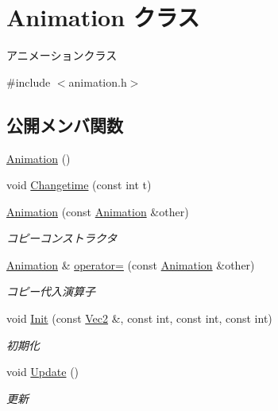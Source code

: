 \hypertarget{class_animation}{}\section{Animation クラス}
\label{class_animation}


アニメーションクラス  




{\ttfamily \#include $<$animation.\+h$>$}

\subsection*{公開メンバ関数}
\begin{DoxyCompactItemize}
\item 
\mbox{\hyperlink{class_animation_a83f0a16cef7117f187ad596de38dd9d6}{Animation}} ()
\item 
void \mbox{\hyperlink{class_animation_a6f532d6251cdf027ee8e6af311832c2f}{Changetime}} (const int t)
\item 
\mbox{\hyperlink{class_animation_a7c1388a1e58fb80682aa8e147f58d592}{Animation}} (const \mbox{\hyperlink{class_animation}{Animation}} \&other)
\begin{DoxyCompactList}\small\item\em コピーコンストラクタ \end{DoxyCompactList}\item 
\mbox{\hyperlink{class_animation}{Animation}} \& \mbox{\hyperlink{class_animation_a83fe682e706c6e5cc348b52bc8dbcddd}{operator=}} (const \mbox{\hyperlink{class_animation}{Animation}} \&other)
\begin{DoxyCompactList}\small\item\em コピー代入演算子 \end{DoxyCompactList}\item 
void \mbox{\hyperlink{class_animation_a3f62687a696758fdba6eb1810e971c0d}{Init}} (const \mbox{\hyperlink{common_8h_ae148fff5818e9444b4ab2288829559bf}{Vec2}} \&, const int, const int, const int)
\begin{DoxyCompactList}\small\item\em 初期化 \end{DoxyCompactList}\item 
void \mbox{\hyperlink{class_animation_a0c6a4e940db84d4a6246fcb3ae773402}{Update}} ()
\begin{DoxyCompactList}\small\item\em 更新 \end{DoxyCompactList}\item 

\end{DoxyCompactItemize}
